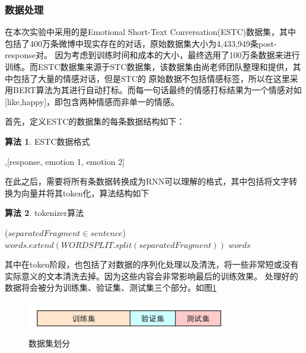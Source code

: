 \documentclass[supercite]{HustGraduPaper}
\theoremstyle{definition}
\newtheorem{alg}{算法}[section]
\begin{document}
\subsubsection{数据处理}
在本次实验中采用的是Emotional Short-Text Conversation(ESTC)数据集，其中包括了400万条微博中现实存在的对话，原始数据集大小为4,433,949条post-response对。
因为考虑到训练时间和成本的大小，最终选用了100万条数据来进行训练。而ESTC数据集来源于STC数据集，该数据集由尚老师团队整理和提供，其中包括了大量的情感对话，但是STC的
原始数据不包括情感标签，所以在这里采用BERT算法为其进行自动打标。而每一句话最终的情感打标结果为一个情感对如[like,happy]，即包含两种情感而非单一的情感。

首先，定义ESTC的数据集的每条数据结构如下：

\begin{shaded*}
  \begin{alg}{ESTC数据格式}
  \label{alg:ESTC}
  \begin{algorithmic}
    ,[response, emotion 1, emotion 2]
  \end{algorithmic}
  \end{alg}
\end{shaded*}

在此之后，需要将所有条数据转换成为RNN可以理解的格式，其中包括将文字转换为向量并将其token化，算法结构如下
\begin{shaded*}
  \begin{alg}{tokenizer算法}
  \label{alg:tok}
  \begin{algorithmic}
    \For ($separatedFragment \in sentence$)
        \State $words.extend(WORDSPLIT.split(separatedFragment))$
    \EndFor
    \State \Return $words$
    \EndProcedure
  \end{algorithmic}
  \end{alg}
\end{shaded*}


其中在token阶段，也包括了对数据的序列化处理以及清洗，将一些非常短或没有实际意义的文本清洗去掉。因为这些内容会非常影响最后的训练效果。
处理好的数据将会被分为训练集、验证集、测试集三个部分。如图\ref{Fig.data}
\begin{figure}[H] %
  \centering %
  \includegraphics[width=0.8\textwidth]{images/data.png} %
  \caption{数据集划分} %
  \label{Fig.data} %
\end{figure}
\end{document}
